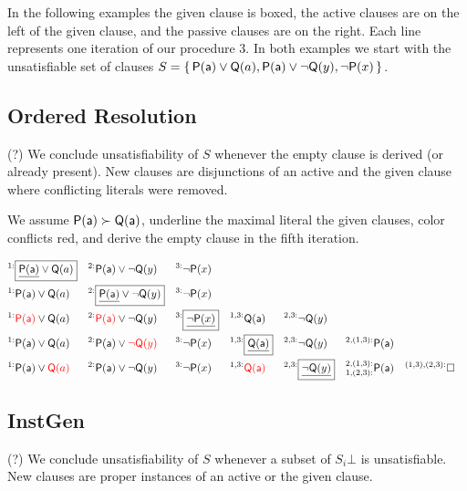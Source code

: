 In the following examples the given clause is boxed, 
the active clauses are on the left of the given clause, 
and the passive clauses are on the right. 
Each line represents one iteration of our procedure 3.
%
In both examples we start with the unsatisfiable set of clauses $S=\{\, {\mathsf P}({\mathsf a})\lor{\mathsf Q}(a), {\mathsf P}({\mathsf a})\lor\lnot{\mathsf Q}(y), \lnot{\mathsf P}(x) \,\}$.

\subsection{Ordered Resolution}

(\Lightning?) We conclude unsatisfiability of $S$ whenever the empty clause is derived (or already present).
New clauses are disjunctions of an active and the given clause where conflicting literals were removed.

\begin{example} We assume ${\mathsf P}({\mathsf a})\succ{\mathsf Q}({\mathsf a})$,
	underline the maximal literal the given clauses,
	color conflicts red,
	 and derive the empty clause in the fifth iteration.
	
	\begin{align*}
	^{1:}&\boxed{\underline{\mP(\ma)}\lor\mQ(a)} 
	& ^{2:}&\mP(\ma)\lor\lnot\mQ(y) & ^{3:}&\lnot\mP(x) 
	\\
	^{1:}&\mP(\ma)\lor\mQ(a) 
	& ^{2:}&\boxed{\underline{\mP(\ma)}\lor\lnot\mQ(y)} & ^{3:}&\lnot\mP(x) 
	\\
	^{1:}&{\colLo\mP(\ma)}\lor\mQ(a) 
	& ^{2:}&{\colLo\mP(\ma)}\lor\lnot\mQ(y) 
	& ^{3:}&\boxed{\underline{\lnot\mP(x)}} 
	& ^{1,3:}&\mQ(\ma) 
	& ^{2,3:}&\lnot\mQ(y)
	\\
	^{1:}&\mP(\ma)\lor\mQ(a) 
	& ^{2:}&\mP(\ma)\lor{\colLo\lnot\mQ(y)} 
	& ^{3:}&\lnot\mP(x)
	& ^{1,3:}&\boxed{\underline{\mQ(\ma)}} 
	& ^{2,3:}&\lnot\mQ(y) 
	& ^{2,(1,3):}&\mP(\ma)
	\\
	^{1:}&\mP(\ma)\lor{\colLo\mQ(a)} 
	& ^{2:}&\mP(\ma)\lor\lnot\mQ(y) 
	& ^{3:}&\lnot\mP(x)
	& ^{1,3:}&\colLo\mQ(\ma) 
	& ^{2,3:}&\boxed{\underline{\lnot\mQ(y)}} 
	& ^{2,(1,3):}_{1,(2,3):}&\mP(\ma)
	& ^{(1,3),(2,3):}&\emptyclause
	\\
	\end{align*}
\end{example}

\subsection{InstGen}

(\Lightning?) We conclude unsatisfiability of $S$ whenever a subset of $S_i\bot$ is unsatisfiable. 
New clauses are proper instances of an active or the given clause.



